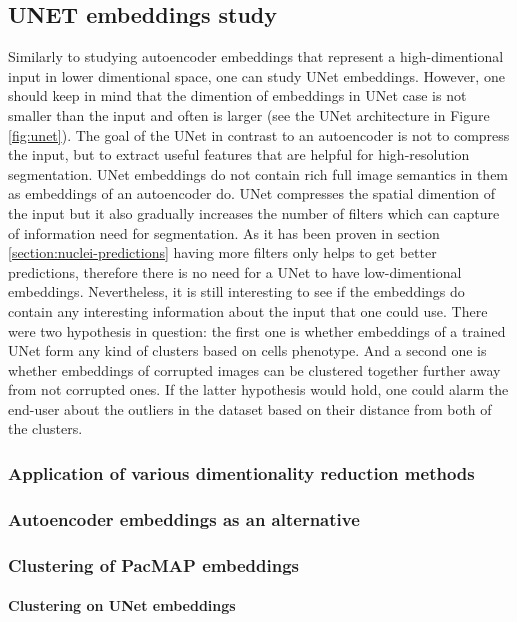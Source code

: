 \subsection{UNET embeddings study}
    Similarly to studying autoencoder embeddings that represent a high-dimentional input in lower dimentional space, one can study UNet embeddings. However, one should keep in mind that the dimention of embeddings in UNet case is not smaller than the input and often is larger (see the UNet architecture in Figure \ref{fig:unet}). The goal of the UNet in contrast to an autoencoder is not to compress the input, but to extract useful features that are helpful for high-resolution segmentation. UNet embeddings do not contain rich full image semantics in them as embeddings of an autoencoder do. UNet compresses the spatial dimention of the input but it also gradually increases the number of filters which can capture of information need for segmentation. As it has been proven in section \ref{section:nuclei-predictions} having more filters only helps to get better predictions, therefore there is no need for a UNet to have low-dimentional embeddings. Nevertheless, it is still interesting to see if the embeddings do contain any interesting information about the input that one could use. There were two hypothesis in question: the first one is whether embeddings of a trained UNet form any kind of clusters based on cells phenotype. And a second one is whether embeddings of corrupted images can be clustered together further away from not corrupted ones. If the latter hypothesis would hold, one could alarm the end-user about the outliers in the dataset based on their distance from both of the clusters. 
    \subsubsection{Application of various dimentionality reduction methods}
        
    \subsubsection{Autoencoder embeddings as an alternative}
        
    \clearpage
    \subsubsection{Clustering of PacMAP embeddings}
        \paragraph{Clustering on UNet embeddings}
        \label{section:clustering-on-unet-embeddings}
        